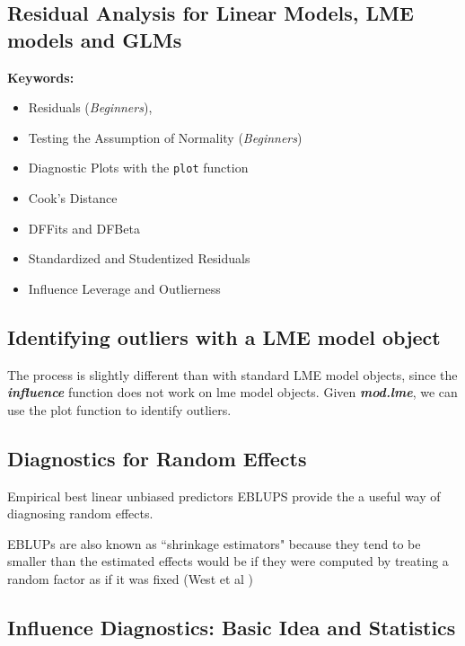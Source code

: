 \documentclass[12pt, a4paper]{article}
\begin{document}
\subsection{Residual Analysis for Linear Models, LME models and GLMs}

\textbf{Keywords:}

\begin{itemize}
	\item Residuals (\emph{Beginners}), 
	\item Testing the Assumption of Normality (\emph{Beginners})
	\item Diagnostic Plots with the \texttt{plot} function
	\item Cook's Distance
	\item DFFits and DFBeta
	\item Standardized and Studentized Residuals
	\item Influence Leverage and Outlierness
\end{itemize}
\newpage

\subsection{Identifying outliers with a LME model object}

The process is slightly different than with standard LME model objects, since the \textbf{\emph{influence}}
function does not work on lme model objects. Given \textbf{\emph{mod.lme}}, we can use the plot function to
identify outliers.
\subsection{Diagnostics for Random Effects}
Empirical best linear unbiased predictors EBLUPS provide the a useful way of diagnosing random effects.

EBLUPs are also known as ``shrinkage estimators" because they tend to be smaller than the estimated effects would be if they were computed by treating a random factor as if it was fixed (West et al )




\newpage


\subsection{Influence Diagnostics: Basic Idea and Statistics} %
\end{document}

